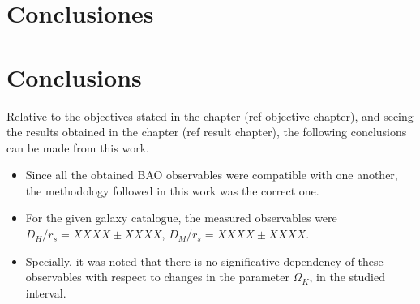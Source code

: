 \chapter*{Conclusiones}


\chapter*{Conclusions}

Relative to the objectives stated in the chapter (ref objective chapter), and seeing the results obtained in the chapter (ref result chapter), the following conclusions can be made from this work.

\begin{itemize}
	\item Since all the obtained BAO observables were compatible with one another, the methodology followed in this work was the correct one. 
	\item For the given galaxy catalogue, the measured observables were $D_H /r_s = XXXX \pm XXXX$,  $D_M / r_s = XXXX \pm XXXX$.
	\item Specially, it was noted that there is no significative dependency of these observables with respect to changes in the parameter $\Omega_K$, in the studied interval.
\end{itemize}

